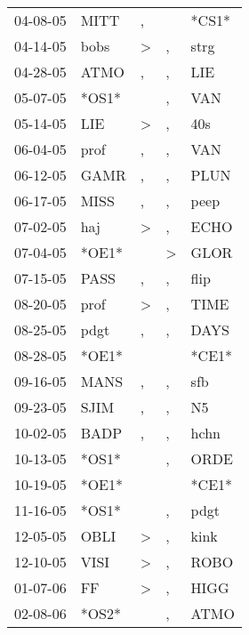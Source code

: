 \begin{supertabular}{lllll}
 04-08-05 &   MITT &                , &                  &  *CS1* \\
 04-14-05 &   bobs &     \textgreater &                , &   strg \\
 04-28-05 &   ATMO &                , &                , &    LIE \\
 05-07-05 &  *OS1* &                  &                , &    VAN \\
 05-14-05 &    LIE &     \textgreater &                , &    40s \\
 06-04-05 &   prof &                , &                , &    VAN \\
 06-12-05 &   GAMR &                , &                , &   PLUN \\
 06-17-05 &   MISS &                , &                , &   peep \\
 07-02-05 &    haj &     \textgreater &                , &   ECHO \\
 07-04-05 &  *OE1* &                  &     \textgreater &   GLOR \\
 07-15-05 &   PASS &                , &                , &   flip \\
 08-20-05 &   prof &     \textgreater &                , &   TIME \\
 08-25-05 &   pdgt &                , &                , &   DAYS \\
 08-28-05 &  *OE1* &                  &                  &  *CE1* \\
 09-16-05 &   MANS &                , &                , &    sfb \\
 09-23-05 &   SJIM &                , &                , &     N5 \\
 10-02-05 &   BADP &                , &                , &   hchn \\
 10-13-05 &  *OS1* &                  &                , &   ORDE \\
 10-19-05 &  *OE1* &                  &                  &  *CE1* \\
 11-16-05 &  *OS1* &                  &                , &   pdgt \\
 12-05-05 &   OBLI &     \textgreater &                , &   kink \\
 12-10-05 &   VISI &     \textgreater &                , &   ROBO \\
 01-07-06 &     FF &     \textgreater &                , &   HIGG \\
 02-08-06 &  *OS2* &                  &                , &   ATMO \\

\end{supertabular}
